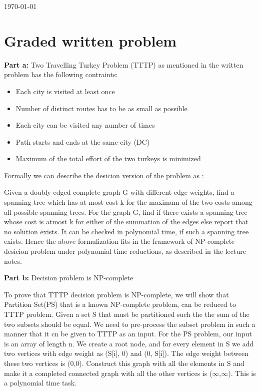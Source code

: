 \documentclass[8pt]{article}
\begin{document}
\hfill \small{\today} \\
\setlength{\fboxrule}{.5mm}\setlength{\fboxsep}{1.2mm}
\newlength{\boxlength}\setlength{\boxlength}{\textwidth}
\addtolength{\boxlength}{-4mm}
\begin{center}\end{center}
\vspace{5mm}

\section{Graded written problem}

\textbf{Part a:} Two Travelling Turkey Problem (TTTP) as mentioned in the written problem has the following contraints:
\begin{itemize}
\item Each city is visited at least once
\item Number of distinct routes has to be as small as possible
\item Each city can be visited any number of times
\item Path starts and ends at the same city (DC)
\item Maximum of the total effort of the two turkeys is minimized
\end{itemize}

Formally we can describe the desicion version of the problem as :

Given a doubly-edged complete graph G with different edge weights, find a spanning tree which has at most cost k for the maximum of the two costs among all possible spanning trees. For the graph G, find if there exists a spanning tree whose cost is atmost k for either of the summation of the edges else report that no solution exists.
It can be checked in polynomial time, if such a spanning tree exists. Hence the above formulization fits in the framework of NP-complete desicion problem under polynomial time reductions, as described in the lecture notes.

\textbf{Part b:} Decision problem is NP-complete

To prove that TTTP decision problem is NP-complete, we will show that Partition Set(PS) that is a known NP-complete problem, can be reduced to TTTP problem.
Given a set S that must be partitioned such the the sum of the two subsets should be equal. We need to pre-process the subset problem in such a manner that it cn be given to TTTP as an input. For the PS problem, our input is an array of length n. We create a root node, and for every element in S we add two vertices with edge weight as (S[i], 0) and (0, S[i]). The edge weight between these two vertices is (0,0). Construct this graph with all the elements in S and make it a completed connected graph with all the other vertices is ($∞$,$∞$). This is a polynomial time task.
\end{document}
